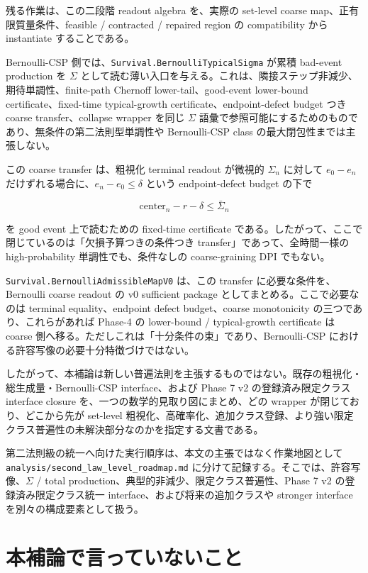 \documentclass[12pt,a4paper]{article}
\begin{document}
残る作業は、この二段階 readout algebra を、実際の set-level coarse map、正有限質量条件、feasible / contracted / repaired region の compatibility から instantiate することである。

Bernoulli-CSP 側では、\texttt{Survival.BernoulliTypicalSigma} が累積 bad-event production を \(\Sigma\) として読む薄い入口を与える。これは、隣接ステップ非減少、期待単調性、finite-path Chernoff lower-tail、good-event lower-bound certificate、fixed-time typical-growth certificate、endpoint-defect budget つき coarse transfer、collapse wrapper を同じ \(\Sigma\) 語彙で参照可能にするためのものであり、無条件の第二法則型単調性や Bernoulli-CSP class の最大閉包性までは主張しない。

この coarse transfer は、粗視化 terminal readout が微視的 \(\Sigma_{n}\) に対して \(e_0-e_{n}\) だけずれる場合に、\(e_{n}-e_0\le\delta\) という endpoint-defect budget の下で

\[
\mathrm{center}_n-r-\delta \le \bar\Sigma_{n}
\]

を good event 上で読むための fixed-time certificate である。したがって、ここで閉じているのは「欠損予算つきの条件つき transfer」であって、全時間一様の high-probability 単調性でも、条件なしの coarse-graining DPI でもない。

\texttt{Survival.BernoulliAdmissibleMapV0} は、この transfer に必要な条件を、Bernoulli coarse readout の v0 sufficient package としてまとめる。ここで必要なのは terminal equality、endpoint defect budget、coarse monotonicity の三つであり、これらがあれば Phase-4 の lower-bound / typical-growth certificate は coarse 側へ移る。ただしこれは「十分条件の束」であり、Bernoulli-CSP における許容写像の必要十分特徴づけではない。

したがって、本補論は新しい普遍法則を主張するものではない。既存の粗視化・総生成量・Bernoulli-CSP interface、および Phase 7 v2 の登録済み限定クラス interface closure を、一つの数学的見取り図にまとめ、どの wrapper が閉じており、どこから先が set-level 粗視化、高確率化、追加クラス登録、より強い限定クラス普遍性の未解決部分なのかを指定する文書である。

第二法則級の統一へ向けた実行順序は、本文の主張ではなく作業地図として \texttt{analysis/second\_law\_level\_roadmap.md} に分けて記録する。そこでは、許容写像、\(\Sigma\) / total production、典型的非減少、限定クラス普遍性、Phase 7 v2 の登録済み限定クラス統一 interface、および将来の追加クラスや stronger interface を別々の構成要素として扱う。

\section{本補論で言っていないこと}\label{ux672cux88dcux8ad6ux3067ux8a00ux3063ux3066ux3044ux306aux3044ux3053ux3068}
\end{document}
